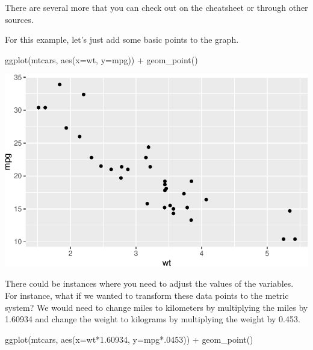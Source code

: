 \documentclass[
  letterpaper,
  DIV=11,
  numbers=noendperiod]{scrreprt}
\newenvironment{Shaded}{\begin{snugshade}}{\end{snugshade}}
\newcommand{\AttributeTok}[1]{\textcolor[rgb]{0.40,0.45,0.13}{#1}}
\newcommand{\DecValTok}[1]{\textcolor[rgb]{0.68,0.00,0.00}{#1}}
\newcommand{\FloatTok}[1]{\textcolor[rgb]{0.68,0.00,0.00}{#1}}
\newcommand{\FunctionTok}[1]{\textcolor[rgb]{0.28,0.35,0.67}{#1}}
\newcommand{\NormalTok}[1]{\textcolor[rgb]{0.00,0.23,0.31}{#1}}
\newcommand{\SpecialCharTok}[1]{\textcolor[rgb]{0.37,0.37,0.37}{#1}}
\begin{document}
There are several more that you can check out on the cheatsheet or
through other sources.

For this example, let's just add some basic points to the graph.

\begin{Shaded}
\begin{Highlighting}[]
\FunctionTok{ggplot}\NormalTok{(mtcars, }\FunctionTok{aes}\NormalTok{(}\AttributeTok{x=}\NormalTok{wt, }\AttributeTok{y=}\NormalTok{mpg)) }\SpecialCharTok{+}
  \FunctionTok{geom\_point}\NormalTok{() }
\end{Highlighting}
\end{Shaded}

\includegraphics{Advanced_Scatterplot_Techniques_files/figure-pdf/unnamed-chunk-3-1.pdf}

There could be instances where you need to adjust the values of the
variables. For instance, what if we wanted to transform these data
points to the metric system? We would need to change miles to kilometers
by multiplying the miles by 1.60934 and change the weight to kilograms
by multiplying the weight by 0.453.

\begin{Shaded}
\begin{Highlighting}[]
\FunctionTok{ggplot}\NormalTok{(mtcars, }\FunctionTok{aes}\NormalTok{(}\AttributeTok{x=}\NormalTok{wt}\SpecialCharTok{*}\FloatTok{1.60934}\NormalTok{, }\AttributeTok{y=}\NormalTok{mpg}\SpecialCharTok{*}\NormalTok{.}\DecValTok{0453}\NormalTok{)) }\SpecialCharTok{+}
  \FunctionTok{geom\_point}\NormalTok{() }
\end{Highlighting}
\end{Shaded}
\end{document}

